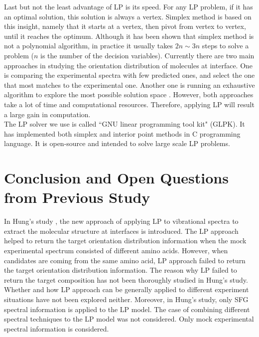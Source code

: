 Last but not the least advantage of LP is its speed. For any LP problem, if it has an optimal solution, this solution is always a vertex. Simplex method is based on this insight, namely that it starts at a vertex, then pivot from vertex to vertex, until it reaches the optimum. Although it has been shown that simplex method is not a polynomial algorithm, in practice it usually takes $2n\sim3n$ steps to solve a problem ($n$ is the number of the decision variables). Currently there are two main approaches in studying the orientation distribution of molecules at interface. One is comparing the experimental spectra with few predicted ones, and select the one that most matches to the experimental one. Another one is running an exhaustive algorithm to explore the most possible solution space \cite{hore0033-rotations}. However, both approaches take a lot of time and computational resources. Therefore, applying LP will result a large gain in computation.\\

The LP solver we use is called ``GNU linear programming tool kit" (GLPK). It has implemented both simplex and interior point methods in C programming language. It is open-source and intended to solve large scale LP problems. \\

\section{Conclusion and Open Questions from Previous Study}
In Hung's study \cite{KuoKaiHung:Thesis:2015}, the new approach of applying LP to vibrational spectra to extract the molecular structure at interfaces is introduced. The LP approach helped to return the target orientation distribution information when the mock experimental spectrum consisted of different amino acids. However, when candidates are coming from the same amino acid, LP approach failed to return the target orientation distribution information. The reason why LP failed to return the target composition has not been thoroughly studied in Hung's study. Whether and how LP approach can be generally applied to different experiment situations have not been explored neither. Moreover, in Hung's study, only SFG spectral information is applied to the LP model. The case of combining different spectral techniques to the LP model was not considered. Only mock experimental spectral information is considered.
	
